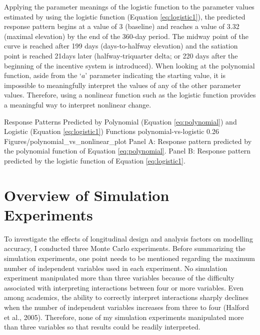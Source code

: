 \documentclass[
12pt, %
twoside,
english]{guelphthesis}
\theoremstyle{definition}
\theoremstyle{definition}
\theoremstyle{definition}
\theoremstyle{definition}
\theoremstyle{remark}
\begin{document}
\noindent Applying the parameter meanings of the logistic function to the parameter values estimated by using the logistic function (Equation \ref{eq:logistic1}), the predicted response pattern begins at a value of 3 (baseline) and reaches a value of 3.32 (maximal elevation) by the end of the 360-day period. The midway point of the curve is reached after 199 days (days-to-halfway elevation) and the satiation point is reached 21days later (halfway-triquarter delta; or 220 days after the beginning of the incentive system is introduced). When looking at the polynomial function, aside from the `\(a\)' parameter indicating the starting value, it is impossible to meaningfully interpret the values of any of the other parameter values. Therefore, using a nonlinear function such as the logistic function provides a meaningful way to interpret nonlinear change.
\begin{apaFigure}
[portrait]
[samepage]
[0cm]
{Response Patterns Predicted by Polynomial (Equation \ref{eq:polynomial}) and Logistic (Equation \ref{eq:logistic1}) Functions}
{polynomial-vs-logistic}
{0.26}
{Figures/polynomial_vs_nonlinear_plot}
{Panel A: Response pattern predicted by the polynomial function of Equation \eqref{eq:polynomial}. Panel B: Response pattern predicted by the logistic function of Equation \eqref{eq:logistic1}.}
\end{apaFigure}
\hypertarget{overview-of-simulation-experiments}{%
\section{Overview of Simulation Experiments}\label{overview-of-simulation-experiments}}

To investigate the effects of longitudinal design and analysis factors on modelling accuracy, I conducted three Monte Carlo experiments. Before summarizing the simulation experiments, one point needs to be mentioned regarding the maximum number of independent variables used in each experiment. No simulation experiment manipulated more than three variables because of the difficulty associated with interpreting interactions between four or more variables. Even among academics, the ability to correctly interpret interactions sharply declines when the number of independent variables increases from three to four (Halford et al., 2005). Therefore, none of my simulation experiments manipulated more than three variables so that results could be readily interpreted.
\end{document}
